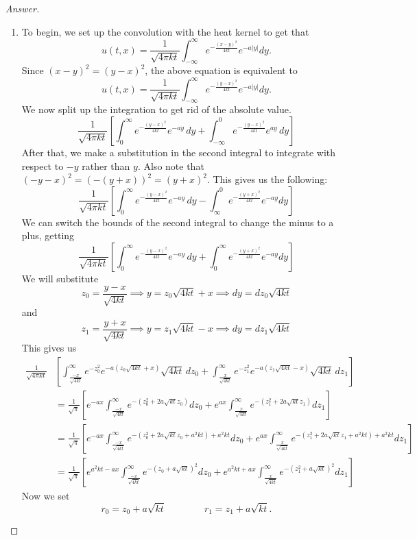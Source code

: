 \documentclass{article}
\theoremstyle{definition}
\renewcommand\qedsymbol{$\blacksquare$}
\newenvironment{ans}{\begin{proof}[Answer]\renewcommand{\qedsymbol}{}}{\end{proof}}
\begin{document}
\begin{ans}
\begin{enumerate}
    \item To begin, we set up the convolution with the heat kernel to get that
    \[u(t,x) = \frac{1}{\sqrt{4\pi kt}}\int_{-\infty}^{\infty}e^{-\frac{(x-y)^2}{4kt}}e^{-a|y|}dy.\]
    Since $(x-y)^2 = (y-x)^2$, the above equation is equivalent to
    \[u(t,x) = \frac{1}{\sqrt{4\pi kt}}\int_{-\infty}^{\infty}e^{-\frac{(y-x)^2}{4kt}}e^{-a|y|}dy.\]
    We now split up the integration to get rid of the absolute value.
    \[\frac{1}{\sqrt{4\pi kt}} \left[ \int_0^\infty e^{-\frac{(y-x)^2}{4kt}} e^{-ay}\,dy + \int_{-\infty}^0 e^{-\frac{(y-x)^2}{4kt}} e^{ay}\,dy \right]\]
    After that, we make a substitution in the second integral to integrate with respect to $-y$ rather than $y$. Also note that $(-y-x)^2 = (-(y+x))^2 = (y+x)^2$. This gives us the following:
    \[\frac{1}{\sqrt{4\pi kt}}\left[ \int_0^\infty e^{-\frac{(y-x)^2}{4kt}} e^{-ay}\,dy - \int_\infty^0 e^{-\frac{(y+x)^2}{4kt}}e^{-ay}dy\right]\]
    We can switch the bounds of the second integral to change the minus to a plus, getting
    \[\frac{1}{\sqrt{4\pi kt}}\left[ \int_0^\infty e^{-\frac{(y-x)^2}{4kt}} e^{-ay}\,dy + \int^\infty_0 e^{-\frac{(y+x)^2}{4kt}}e^{-ay}dy\right]\]
    We will substitute 
    \[z_0 = \frac{y-x}{\sqrt{4kt}} \implies y = z_0\sqrt{4kt} + x \implies dy = dz_0\sqrt{4kt}\] and 
    \[z_1 = \frac{y+x}{\sqrt{4kt}} \implies y = z_1\sqrt{4kt} - x \implies dy = dz_1\sqrt{4kt}\]
    This gives us
    \begin{align*}
        \frac{1}{\sqrt{4\pi kt}}&\left[ \int_{\frac{-x}{\sqrt{4kt}}}^\infty e^{-z_0^2} e^{-a(z_0\sqrt{4kt} + x)}\sqrt{4kt}\,dz_0 + \int_{\frac{x}{\sqrt{4kt}}}^\infty e^{-z_1^2}e^{-a(z_1\sqrt{4kt} - x)}\sqrt{4kt}\,dz_1\right]\\
        &= \frac{1}{\sqrt{\pi}}\left[ e^{-ax}\int_{\frac{-x}{\sqrt{4kt}}}^\infty e^{-(z_0^2 + 2a\sqrt{kt}z_0)}dz_0 + e^{ax}\int_{\frac{x}{\sqrt{4kt}}} ^\infty e^{-(z_1^2 + 2a\sqrt{kt}z_1)}dz_1\right]\\
        &= \frac{1}{\sqrt{\pi}}\left[ e^{-ax}\int_{\frac{-x}{\sqrt{4kt}}}^\infty e^{-(z_0^2 + 2a\sqrt{kt}z_0 + a^2kt) + a^2kt}dz_0 + e^{ax}\int_{\frac{x}{\sqrt{4kt}}} ^\infty e^{-(z_1^2 + 2a\sqrt{kt}z_1 + a^2kt) + a^2kt}dz_1\right]\\
        &= \frac{1}{\sqrt{\pi}}\left[ e^{a^2kt - ax}\int_{\frac{-x}{\sqrt{4kt}}}^\infty e^{-(z_0 + a\sqrt{kt})^2}dz_0 + e^{a^2kt + ax}\int_{\frac{x}{\sqrt{4kt}}} ^\infty e^{-(z_1^2 + a\sqrt{kt})^2}dz_1\right]
    \end{align*}
    Now we set
    \[r_0 = z_0 + a\sqrt{kt} \quad\quad\quad\quad r_1 = z_1 + a\sqrt{kt}.\]

\end{enumerate}
\end{ans}
\end{document}
